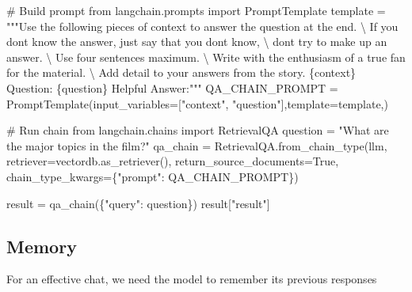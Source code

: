 \documentclass[
  letterpaper,
  DIV=11,
  numbers=noendperiod]{scrreprt}
\newenvironment{Shaded}{\begin{snugshade}}{\end{snugshade}}
\newcommand{\CharTok}[1]{\textcolor[rgb]{0.13,0.47,0.30}{#1}}
\newcommand{\CommentTok}[1]{\textcolor[rgb]{0.37,0.37,0.37}{#1}}
\newcommand{\ImportTok}[1]{\textcolor[rgb]{0.00,0.46,0.62}{#1}}
\newcommand{\NormalTok}[1]{\textcolor[rgb]{0.00,0.23,0.31}{#1}}
\newcommand{\OperatorTok}[1]{\textcolor[rgb]{0.37,0.37,0.37}{#1}}
\newcommand{\SpecialCharTok}[1]{\textcolor[rgb]{0.37,0.37,0.37}{#1}}
\newcommand{\StringTok}[1]{\textcolor[rgb]{0.13,0.47,0.30}{#1}}
\newcommand{\VariableTok}[1]{\textcolor[rgb]{0.07,0.07,0.07}{#1}}
\begin{document}
\begin{Shaded}
\begin{Highlighting}[]
\CommentTok{\# Build prompt}
\ImportTok{from}\NormalTok{ langchain.prompts }\ImportTok{import}\NormalTok{ PromptTemplate}
\NormalTok{template }\OperatorTok{=} \StringTok{"""Use the following pieces of context to answer the question at the end. }\CharTok{\textbackslash{}}
\StringTok{If you don\textquotesingle{}t know the answer, just say that you don\textquotesingle{}t know, }\CharTok{\textbackslash{}}
\StringTok{don\textquotesingle{}t try to make up an answer.  }\CharTok{\textbackslash{}}
\StringTok{Use four sentences maximum.  }\CharTok{\textbackslash{}}
\StringTok{Write with the enthusiasm of a true fan for the material. }\CharTok{\textbackslash{}}
\StringTok{Add detail to your answers from the story.}
\SpecialCharTok{\{context\}}
\StringTok{Question: }\SpecialCharTok{\{question\}}
\StringTok{Helpful Answer:"""}
\NormalTok{QA\_CHAIN\_PROMPT }\OperatorTok{=}\NormalTok{ PromptTemplate(input\_variables}\OperatorTok{=}\NormalTok{[}\StringTok{"context"}\NormalTok{, }\StringTok{"question"}\NormalTok{],template}\OperatorTok{=}\NormalTok{template,)}

\CommentTok{\# Run chain}
\ImportTok{from}\NormalTok{ langchain.chains }\ImportTok{import}\NormalTok{ RetrievalQA}
\NormalTok{question }\OperatorTok{=} \StringTok{"What are the major topics in the film?"}
\NormalTok{qa\_chain }\OperatorTok{=}\NormalTok{ RetrievalQA.from\_chain\_type(llm,}
\NormalTok{                                       retriever}\OperatorTok{=}\NormalTok{vectordb.as\_retriever(),}
\NormalTok{                                       return\_source\_documents}\OperatorTok{=}\VariableTok{True}\NormalTok{,}
\NormalTok{                                       chain\_type\_kwargs}\OperatorTok{=}\NormalTok{\{}\StringTok{"prompt"}\NormalTok{: QA\_CHAIN\_PROMPT\})}


\NormalTok{result }\OperatorTok{=}\NormalTok{ qa\_chain(\{}\StringTok{"query"}\NormalTok{: question\})}
\NormalTok{result[}\StringTok{"result"}\NormalTok{]}
\end{Highlighting}
\end{Shaded}

\hypertarget{memory-1}{%
\subsection{Memory}\label{memory-1}}

For an effective chat, we need the model to remember its previous
responses
\end{document}
